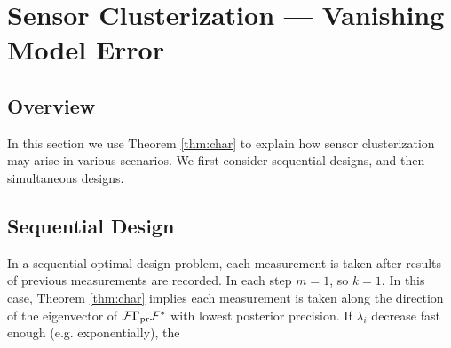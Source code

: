 \section{Sensor Clusterization --- Vanishing Model Error}\label{section:clusterization}
\subsection{Overview}
In this section we use Theorem \ref{thm:char} to explain how sensor
clusterization may arise in various scenarios. We first consider
sequential designs, and then simultaneous designs.


\subsection{Sequential Design}\label{subsec:clusterization sequential}
In a sequential optimal design problem, each measurement is taken
after results of previous measurements are recorded. In each step
$m=1$, so $k=1$. In this case, Theorem \ref{thm:char} implies each
measurement is taken along the direction of the eigenvector of $\mathcal{F}
\Gamma_{\textup{pr}} \mathcal{F}^*$ with lowest posterior precision. If $\lambda_i$
decrease fast enough (e.g. exponentially), the

